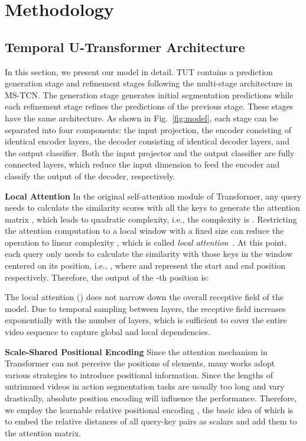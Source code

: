 \documentclass[letterpaper]{article} \usepackage[submission]{aaai23}  \usepackage{times}  \usepackage{helvet}  \usepackage{courier}  \usepackage[hyphens]{url}  \usepackage{graphicx} \urlstyle{rm} \def\UrlFont{\rm}  \usepackage{natbib}  \usepackage{caption} \frenchspacing  \setlength{\pdfpagewidth}{8.5in} \setlength{\pdfpageheight}{11in} \usepackage{algorithm}
\begin{document}
\section{Methodology}


\subsection{Temporal U-Transformer Architecture}
In this section, we present our model in detail. TUT contains a prediction generation stage and  refinement stages following the multi-stage architecture in MS-TCN. The generation stage generates initial segmentation predictions while each refinement stage refines the predictions of the previous stage. These stages have the same architecture. As shown in Fig.~\ref{fig:model}, each stage can be separated into four components: the input projection, the encoder consisting of  identical encoder layers, the decoder consisting of  identical decoder layers, and the output classifier. Both the input projector and the output classifier are fully connected layers, which reduce the input dimension to feed the encoder and classify the output of the decoder, respectively.

\textbf{Local Attention}\quad
In the original self-attention module of Transformer, any query  needs to calculate the similarity scores with all the keys  to generate the attention matrix , which leads to quadratic complexity, i.e., the complexity is . Restricting the attention computation to a local window with a fixed size  can reduce the operation to linear complexity , which is called \textit{local attention}~\cite{beltagy2020longformer}. At this point, each query  only needs to calculate the similarity with those keys in the window centered on its position, i.e., , where  and  represent the start and end position respectively. Therefore, the output of the -th position is:






The local attention () does not narrow down the overall receptive field of the model. Due to temporal sampling between layers, the receptive field increases exponentially with the number of layers, which is sufficient to cover the entire video sequence to capture global and local dependencies. 


\textbf{Scale-Shared Positional Encoding}\quad
Since the attention mechanism in Transformer can not perceive the positions of elements, many works \cite{dai2019transformer, ke2020rethinking} adopt various strategies to introduce positional information. Since the lengths of untrimmed videos in action segmentation tasks are usually too long and vary drastically, absolute position encoding will influence the performance. Therefore, we employ the learnable relative positional encoding \cite{shaw2018self}, the basic idea of which is to embed the relative distances of all query-key pairs as scalars and add them to the attention matrix.
\end{document}
